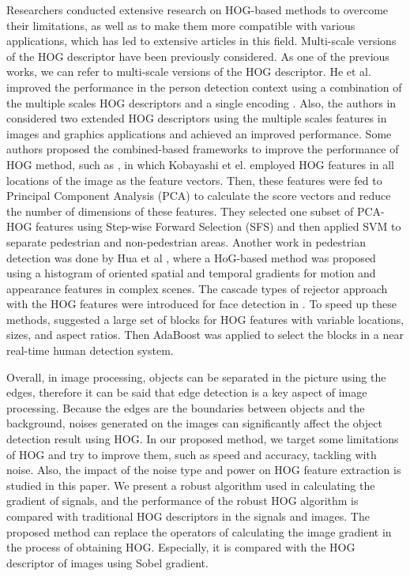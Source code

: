 \documentclass{elsarticle}
\begin{document}
Researchers conducted extensive research on HOG-based methods to overcome their limitations, as well as to make them more compatible with various applications, which has led to extensive articles in this field.
Multi-scale versions of the HOG descriptor have been previously considered. As one of the previous works, we can refer to multi-scale versions of the HOG descriptor. He et al. improved  the performance in the person detection context using a combination of the multiple scales HOG descriptors and a single encoding \cite{H16}.
Also, the authors in \cite{H17} considered two extended HOG descriptors using the multiple scales features in images and graphics applications and achieved an improved performance.
Some authors proposed the combined-based frameworks to improve the performance of HOG method, such as \cite{H18}, in which Kobayashi et el. employed HOG features in all locations of the image as the feature vectors. Then, these features were fed to Principal Component Analysis (PCA) to calculate the score vectors and reduce the number of dimensions of these features. They selected one subset of PCA-HOG features using Step-wise Forward Selection (SFS) and then applied SVM to separate pedestrian and non-pedestrian areas. Another work in pedestrian detection was done by Hua et al \cite{H19}, where a HoG-based method was proposed using a histogram of oriented spatial and temporal gradients for motion and appearance features in complex scenes.
The cascade types of rejector approach with the HOG features were introduced for face detection in \cite{H20,H21}. To speed up these methods, \cite{H22} suggested a large set of blocks for HOG features with variable locations, sizes, and aspect ratios. Then AdaBoost was applied to select the blocks in a near real-time human detection
system.

Overall, in image processing, objects can be separated in the picture using the edges, therefore it can be said that edge detection is a key aspect of image processing. Because the edges are the boundaries between objects and the background, noises generated on the images can significantly affect the object detection result using HOG. 
In our proposed method, we target some limitations of HOG and try to improve them, such as speed and accuracy, tackling with noise.
Also, the impact of the noise type and power on HOG feature extraction is studied in this paper. 
We present a robust algorithm used in calculating the gradient of signals, and the performance of the robust HOG algorithm is compared with traditional HOG descriptors in the signals and images. The proposed method can replace the operators of calculating the image gradient in the process of obtaining HOG.
Especially, it is compared with the HOG descriptor of images using Sobel gradient.
\end{document}
